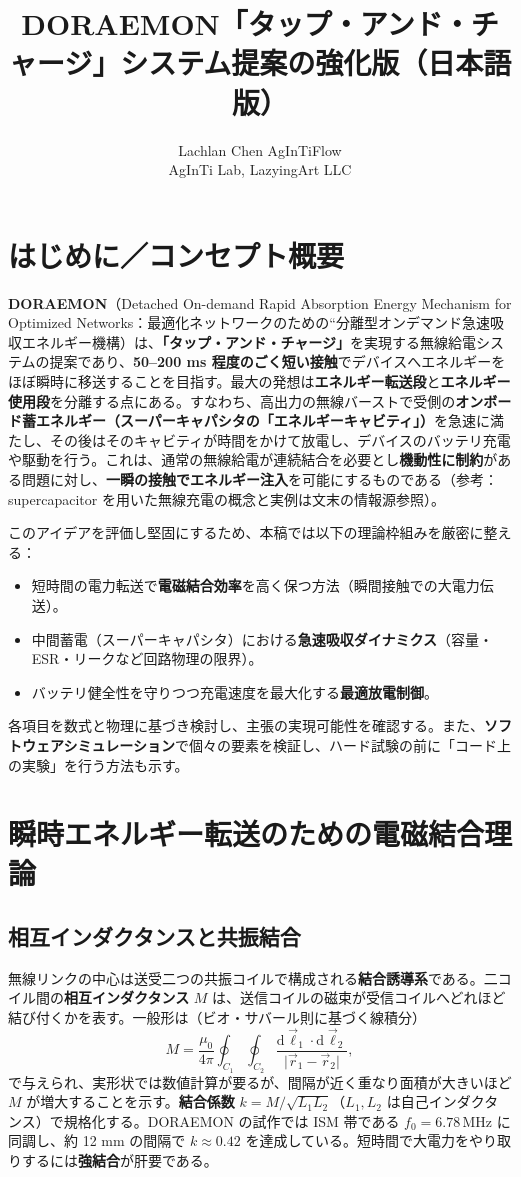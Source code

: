 \documentclass[11pt]{ctexart}
\title{DORAEMON「タップ・アンド・チャージ」システム提案の強化版（日本語版）}
\author{\begin{tabular}{c}Lachlan Chen \quad AgInTiFlow\\AgInTi Lab, LazyingArt LLC\end{tabular}}
\date{}
\begin{document}
\maketitle

\section{はじめに／コンセプト概要}
\textbf{DORAEMON}（Detached On-demand Rapid Absorption Energy Mechanism for Optimized Networks：最適化ネットワークのための“分離型オンデマンド急速吸収エネルギー機構）は、\textbf{「タップ・アンド・チャージ」}を実現する無線給電システムの提案であり、\textbf{50--200 ms 程度のごく短い接触}でデバイスへエネルギーをほぼ瞬時に移送することを目指す。最大の発想は\textbf{エネルギー転送段}と\textbf{エネルギー使用段}を分離する点にある。すなわち、高出力の無線バーストで受側の\textbf{オンボード蓄エネルギー（スーパーキャパシタの「エネルギーキャビティ」）}を急速に満たし、その後はそのキャビティが時間をかけて放電し、デバイスのバッテリ充電や駆動を行う。これは、通常の無線給電が連続結合を必要とし\textbf{機動性に制約}がある問題に対し、\textbf{一瞬の接触でエネルギー注入}を可能にするものである（参考：supercapacitor を用いた無線充電の概念と実例は文末の情報源参照）。

このアイデアを評価し堅固にするため、本稿では以下の理論枠組みを厳密に整える：
\begin{itemize}
  \item 短時間の電力転送で\textbf{電磁結合効率}を高く保つ方法（瞬間接触での大電力伝送）。
  \item 中間蓄電（スーパーキャパシタ）における\textbf{急速吸収ダイナミクス}（容量・ESR・リークなど回路物理の限界）。
  \item バッテリ健全性を守りつつ充電速度を最大化する\textbf{最適放電制御}。
\end{itemize}
各項目を数式と物理に基づき検討し、主張の実現可能性を確認する。また、\textbf{ソフトウェアシミュレーション}で個々の要素を検証し、ハード試験の前に「コード上の実験」を行う方法も示す。

\section{瞬時エネルギー転送のための電磁結合理論}
\subsection{相互インダクタンスと共振結合}
無線リンクの中心は送受二つの共振コイルで構成される\textbf{結合誘導系}である。二コイル間の\textbf{相互インダクタンス} $M$ は、送信コイルの磁束が受信コイルへどれほど結び付くかを表す。一般形は（ビオ・サバール則に基づく線積分）
\begin{equation}
M=\frac{\mu_0}{4\pi}\oint_{C_1}\oint_{C_2}\frac{\mathrm{d}\vec{\ell}_1\cdot \mathrm{d}\vec{\ell}_2}{\lvert\vec r_1-\vec r_2\rvert},
\end{equation}
で与えられ、実形状では数値計算が要るが、間隔が近く重なり面積が大きいほど $M$ が増大することを示す。\textbf{結合係数} $k=M/\sqrt{L_1L_2}$（$L_1,L_2$ は自己インダクタンス）で規格化する。DORAEMON の試作では ISM 帯である $f_0=6.78\,\mathrm{MHz}$ に同調し、約 12 mm の間隔で $k\approx0.42$ を達成している。短時間で大電力をやり取りするには\textbf{強結合}が肝要である。
\end{document}
